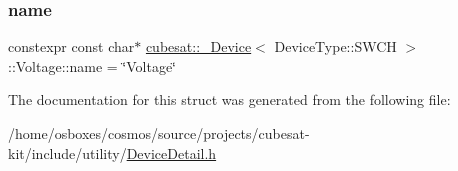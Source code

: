 \subsubsection{\texorpdfstring{name}{name}}
{\footnotesize\ttfamily constexpr const char$\ast$ \hyperlink{structcubesat_1_1__Device}{cubesat\+::\+\_\+\+Device}$<$ Device\+Type\+::\+S\+W\+CH $>$\+::Voltage\+::name = \char`\"{}Voltage\char`\"{}\hspace{0.3cm}{\ttfamily [static]}}



The documentation for this struct was generated from the following file\+:\begin{DoxyCompactItemize}
\item 
/home/osboxes/cosmos/source/projects/cubesat-\/kit/include/utility/\hyperlink{DeviceDetail_8h}{Device\+Detail.\+h}\end{DoxyCompactItemize}
